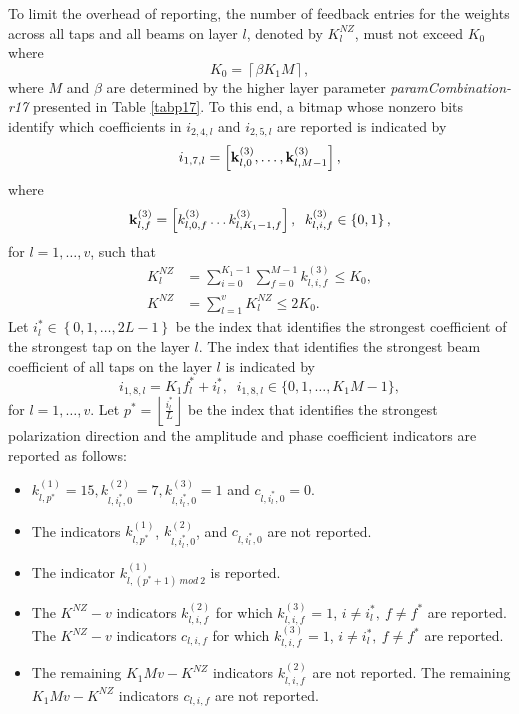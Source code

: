 \documentclass[lettersize,journal]{IEEEtran}
\begin{document}
To limit the overhead of reporting, the number of feedback entries for the weights across all taps and all beams on layer $l$, denoted by $K_l^{NZ}$, must not exceed $K_0$ where
\begin{equation}
K_0=\left\lceil\beta K_1M\right\rceil ,   
\end{equation}
where $M$ and $\beta$ are determined by the higher layer parameter \emph{paramCombination-r17} presented in Table \ref{tabp17}. To this end, a bitmap whose nonzero bits identify which coefficients in $i_{2,4,l}$ and $i_{2,5,l}$ are reported is indicated by 
\begin{equation}
i_{1,7,l}=\left[{\bf{k}}_{l,0}^{\left(3\right)},\ldots, {\bf{k}}_{l,M-1}^{\left(3\right)}\right],    
\end{equation}
where 
\begin{equation}
 {\bf{k}}_{l,f}^{\left(3\right)}=\left[k_{l,0,f}^{\left(3\right)}\ldots k_{l,K_1-1,f}^{\left(3\right)}\right], \;\;  k_{l,i,f}^{(3)}\in\left\{0,1\right\},
\end{equation}
for $l=1,\ldots,v$, such that
\begin{equation}
\begin{aligned}
    K_l^{NZ}&=\sum_{i=0}^{K_1-1}\sum_{f=0}^{M-1}k_{l,i,f}^{(3)}\le K_0,    \\
    K^{NZ}&=\sum_{l=1}^{v}K_l^{NZ}\le2K_0. 
\end{aligned}
\end{equation}
Let $i_l^\ast\in\left\{0,1,\ldots,2L-1\right\}$ be the index that identifies the strongest coefficient of the strongest tap on the layer $l$. The index that identifies the strongest beam coefficient of all taps on the layer $l$ is indicated by
\begin{equation}
{i_{1,8,l}} = {K_1}f_l^ \ast  + i_l^ \ast,\;\; {i_{1,8,l}} \in \{ 0,1, \ldots ,{K_1}M - 1\},
\end{equation}
for $l=1,\ldots,v$. Let $p^\ast=\left\lfloor\frac{i_l^\ast}{L}\right\rfloor$ be the index that identifies the strongest polarization direction and the amplitude and phase coefficient indicators are reported as follows:
\begin{itemize}
    \item $k_{l,p^\ast}^{(1)}=15, k_{l,i_l^\ast,0}^{(2)}=7, k_{l,i_l^\ast,0}^{(3)}=1$ and $c_{l,i_l^\ast,0}=0$.
    \item The indicators $k_{l,p^\ast}^{(1)}$, $k_{l,i_l^\ast,0}^{(2)}$, and $c_{l,i_l^\ast,0}$ are not reported.
    \item The indicator $k_{l,(p^\ast+1)\ mod\ 2}^{(1)}$ is reported.
    \item The $K^{NZ}-v$ indicators $k_{l,i,f}^{(2)}$ for which $k_{l,i,f}^{(3)}=1$, $i\neq i_l^\ast,\ f\neq f^\ast$ are reported. The $K^{NZ}-v$ indicators $c_{l,i,f}$ for which $k_{l,i,f}^{(3)}=1$, $i\neq i_l^\ast,\ f\neq f^\ast$ are reported. 
    \item The remaining $K_1Mv-K^{NZ}$ indicators $k_{l,i,f}^{(2)}$ are not reported. The remaining $K_1Mv-K^{NZ}$ indicators $c_{l,i,f}$ are not reported.
\end{itemize}
\end{document}
